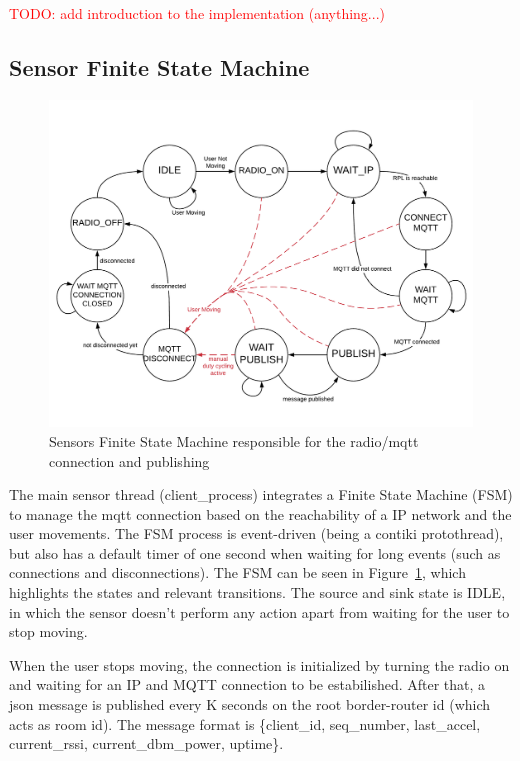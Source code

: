 \documentclass[a4paper, 11pt]{article}
\begin{document}
\textcolor{red}{TODO: add introduction to the implementation (anything...)}

\subsection*{Sensor Finite State Machine}

\begin{figure}[h]
\centering
    \includegraphics[width=\linewidth]{images/fsm.pdf}
    \caption{Sensors Finite State Machine responsible for the radio/mqtt connection and publishing}
    \label{fig:sensor_fsm}
\end{figure}

The main sensor thread (client\_process) integrates a Finite State Machine (FSM) to manage the mqtt connection based on the reachability of a IP network and the user movements.
The FSM process is event-driven (being a contiki protothread), but also has a default timer of one second when waiting for long events (such as connections and disconnections).
The FSM can be seen in Figure~\ref{fig:sensor_fsm}, which highlights the states and relevant transitions.
The source and sink state is IDLE, in which the sensor doesn't perform any action apart from waiting for the user to stop moving.

When the user stops moving, the connection is initialized by turning the radio on and waiting for an IP and MQTT connection to be estabilished. 
After that, a json message is published every K seconds on the root border-router id (which acts as room id).
The message format is \{client\_id, seq\_number, last\_accel, current\_rssi, current\_dbm\_power, uptime\}.
\end{document}
